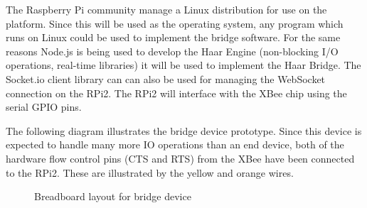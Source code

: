         The Raspberry Pi community manage a Linux distribution for use on the platform. Since this will be used as the operating system, any program which runs on Linux could be used to implement the bridge software. For the same reasons Node.js is being used to develop the Haar Engine (non-blocking I/O operations, real-time libraries) it will be used to implement the Haar Bridge. The Socket.io client library can can also be used for managing the WebSocket connection on the RPi2. The RPi2 will interface with the XBee chip using the serial GPIO pins.

        The following diagram illustrates the bridge device prototype. Since this device is expected to handle many more IO operations than an end device, both of the hardware flow control pins (CTS and RTS) from the XBee have been connected to the RPi2. These are illustrated by the yellow and orange wires.

        \begin{figure}
          \centering
          \caption{Breadboard layout for bridge device}\label{figure:bridge}
        \end{figure}
